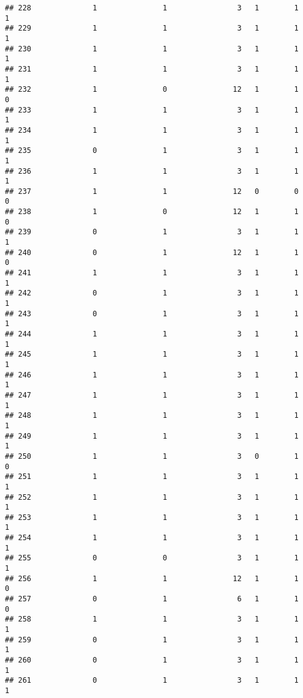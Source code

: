\documentclass[]{article}
\begin{document}
\begin{verbatim}
## 228              1               1                3   1        1        1
## 229              1               1                3   1        1        1
## 230              1               1                3   1        1        1
## 231              1               1                3   1        1        1
## 232              1               0               12   1        1        0
## 233              1               1                3   1        1        1
## 234              1               1                3   1        1        1
## 235              0               1                3   1        1        1
## 236              1               1                3   1        1        1
## 237              1               1               12   0        0        0
## 238              1               0               12   1        1        0
## 239              0               1                3   1        1        1
## 240              0               1               12   1        1        0
## 241              1               1                3   1        1        1
## 242              0               1                3   1        1        1
## 243              0               1                3   1        1        1
## 244              1               1                3   1        1        1
## 245              1               1                3   1        1        1
## 246              1               1                3   1        1        1
## 247              1               1                3   1        1        1
## 248              1               1                3   1        1        1
## 249              1               1                3   1        1        1
## 250              1               1                3   0        1        0
## 251              1               1                3   1        1        1
## 252              1               1                3   1        1        1
## 253              1               1                3   1        1        1
## 254              1               1                3   1        1        1
## 255              0               0                3   1        1        1
## 256              1               1               12   1        1        0
## 257              0               1                6   1        1        0
## 258              1               1                3   1        1        1
## 259              0               1                3   1        1        1
## 260              0               1                3   1        1        1
## 261              0               1                3   1        1        1

\end{verbatim}
\end{document}
